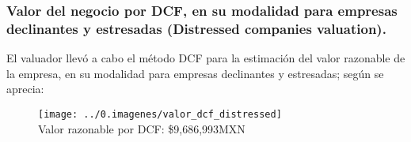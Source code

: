 \newcommand{\valorDCF}{9,686,993}

\subsubsection{Valor del negocio por DCF, en su modalidad para empresas declinantes y estresadas (Distressed companies valuation).}

 El valuador llev\'o a cabo el m\'etodo DCF para la estimaci\'on del valor razonable de la empresa, en su modalidad para empresas declinantes y estresadas; seg\'un se aprecia: 

\begin{figure}[H]
\centering
\texttt{[image: ../0.imagenes/valor\_dcf\_distressed]}\\

Valor razonable por DCF: \textcolor{principal}{\$\valorDCF MXN}
\end{figure}